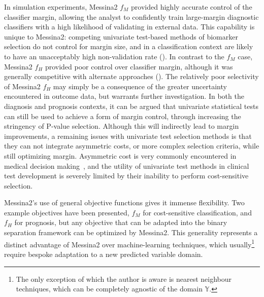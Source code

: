 \documentclass[dissertation.tex]{subfiles}
\begin{document}
In simulation experiments, Messina2 $f_M$ provided highly accurate control of the classifier margin, allowing the analyst to confidently train large-margin diagnostic classifiers with a high likelihood of validating in external data.  This capability is unique to Messina2: competing univariate test-based methods of biomarker selection do not control for margin size, and in a classification context are likely to have an unacceptably high non-validation rate ().  In contrast to the $f_M$ case, Messina2 $f_H$ provided poor control over classifier margin, although it was generally competitive with alternate approaches ().  The relatively poor selectivity of Messina2 $f_H$ may simply be a consequence of the greater uncertainty encountered in outcome data, but warrants further investigation.  In both the diagnosis and prognosis contexts, it can be argued that univariate statistical tests can still be used to achieve a form of margin control, through increasing the stringency of P-value selection.  Although this will indirectly lead to margin improvements, a remaining issues with univariate test selection methods is that they can not integrate asymmetric costs, or more complex selection criteria, while still optimizing margin.  Asymmetric cost is very commonly encountered in medical decision making~\cite{Pepe2001}, and the utility of univariate test methods in clinical test development is severely limited by their inability to perform cost-sensitive selection.

Messina2's use of general objective functions gives it immense flexibility.  Two example objectives have been presented, $f_M$ for cost-sensitive classification, and $f_H$ for prognosis, but any objective that can be adapted into the binary separation framework can be optimized by Messina2.  This generality represents a distinct advantage of Messina2 over machine-learning techniques, which usually\footnote{The only exception of which the author is aware is nearest neighbour techniques, which can be completely agnostic of the domain $\mathbb{Y}$.} require bespoke adaptation to a new predicted variable domain.
\end{document}
